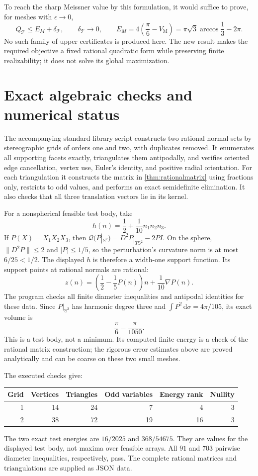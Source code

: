 \documentclass[11pt]{article}
\theoremstyle{remark}\newtheorem{remark}[theorem]{Remark}
\newcommand{\Sph}{\mathbb S^2}
\newcommand{\Q}{\mathcal Q}
\newcommand{\dd}{\,\mathrm d}
\newcommand{\VM}{V_{\mathrm M}}
\numberwithin{equation}{section}
\begin{document}
To reach the sharp Meissner value by this formulation, it would suffice to
prove, for meshes with $\epsilon\to0$,
\[
 Q_{\mathcal T}\le E_M+\delta_{\mathcal T},\qquad
 \delta_{\mathcal T}\to0,\qquad
 E_M=4\left(\frac\pi6-\VM\right)
 =\pi\sqrt3\arccos\frac13-2\pi.
\]
No such family of upper certificates is produced here. The new result makes
the required objective a fixed rational quadratic form while preserving
finite realizability; it does not solve its global maximization.

\section{Exact algebraic checks and numerical status}
The accompanying standard-library script constructs two rational normal
sets by stereographic grids of orders one and two, with duplicates removed.
It enumerates all supporting facets exactly, triangulates them antipodally,
and verifies oriented edge cancellation, vertex use, Euler's identity, and
positive radial orientation. For each triangulation it constructs the
matrix in \cref{thm:rationalmatrix} using fractions only, restricts to odd
values, and performs an exact semidefinite elimination. It also checks
that all three translation vectors lie in its kernel.

For a nonspherical feasible test body, take
\[
 h(n)=\frac12+\frac1{10}n_1n_2n_3.
\]
If $P(X)=X_1X_2X_3$, then
$\Q(P|_{\Sph})=D^2P|_{T\Sph}-2PI$.
On the sphere, $\|D^2P\|\le2$ and $|P|\le1/5$, so the perturbation's
curvature norm is at most $6/25<1/2$. The displayed $h$ is therefore a
width-one support function. Its support points at rational normals are
rational:
\[
 z(n)=\left(\frac12-\frac15P(n)\right)n+\frac1{10}\nabla P(n).
\]
The program checks all finite diameter inequalities and antipodal identities
for these data. Since $P|_{\Sph}$ has harmonic degree three and
$\int P^2\dd\sigma=4\pi/105$, its exact volume is
\[
 \frac\pi6-\frac{\pi}{1050}.
\]
This is a test body, not a minimum. Its computed finite energy is a check of
the rational matrix construction; the rigorous error estimates above are
proved analytically and can be coarse on these two small meshes.

The executed checks give:
\begin{center}
\begin{tabular}{rrrrrr}
\toprule
Grid & Vertices & Triangles & Odd variables & Energy rank & Nullity\\
\midrule
1&14&24&7&4&3\\
2&38&72&19&16&3\\
\bottomrule
\end{tabular}
\end{center}
The two exact test energies are $16/2025$ and $368/54675$.
They are values for the displayed test body, not maxima over feasible arrays.
All $91$ and $703$ pairwise diameter inequalities, respectively, pass.
The complete rational matrices and triangulations are supplied as JSON data.
\end{document}
